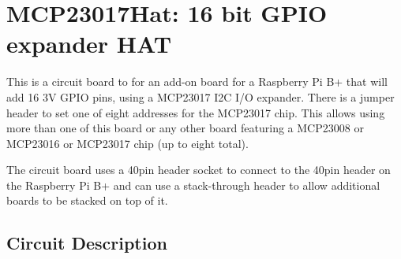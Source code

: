 %
%
%
%
% 
%
%
%
%
%
% 
%

\chapter{MCP23017Hat: 16 bit GPIO expander HAT}

This is a circuit board to for an add-on board for a Raspberry Pi B+ that will 
add 16 3V GPIO pins, using a MCP23017 I2C I/O expander. There is a jumper 
header to set one of eight addresses for the MCP23017 chip.  This allows using 
more than one of this board or any other board featuring a MCP23008 or 
MCP23016 or MCP23017 chip (up to eight total). 

The circuit board uses a 40pin header socket to connect to the 40pin header on 
the  Raspberry Pi B+ and can use a  stack-through  header to allow  additional 
boards to be stacked on top of it.                                             
 
\section{Circuit Description}          

